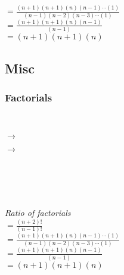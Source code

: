 \documentclass{article}
\begin{document}
        $= \frac{(n+1)(n+1)(n)(n-1)\cdots(1)}{(n-1)(n-2)(n-3)\cdots(1)}$\\[15pt]
        
        $= \frac{(n+1)(n+1)(n)(n-1)}{(n-1)}$\\[15pt]

        $= {(n+1)(n+1)(n)}$\\[15pt]

        \endgroup
    \pagebreak



\subsection{\centering \huge Misc}
    \centering
    \subsubsection{\huge Factorials}

        \hrulefill \\[10pt]


            $\rightarrow$


            $\rightarrow$


            \hrulefill \\[10pt]

    \\

    \hrulefill \\[10pt]

    \\[5pt]
    \textit{Ratio of factorials}\\[15pt]

    $=\frac{(n+2)!}{(n-1)!}$\\[15pt]
    
    $= \frac{(n+1)(n+1)(n)(n-1)\cdots(1)}{(n-1)(n-2)(n-3)\cdots(1)}$\\[15pt]
    
    $= \frac{(n+1)(n+1)(n)(n-1)}{(n-1)}$\\[15pt]

    $= {(n+1)(n+1)(n)}$\\[15pt]
\end{document}

